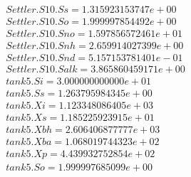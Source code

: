\begin{align*}
    Settler.S10.Ss = 1.315923153747e+00\\
    Settler.S10.So = 1.999997854492e+00\\
    Settler.S10.Sno = 1.597856572461e+01\\
    Settler.S10.Snh = 2.659914027399e+00\\
    Settler.S10.Snd = 5.157153781401e-01\\
    Settler.S10.Salk = 3.865860459171e+00\\
    tank5.Si = 3.000000000000e+01\\
    tank5.Ss = 1.263795984345e+00\\
    tank5.Xi = 1.123348086405e+03\\
    tank5.Xs = 1.185225923915e+01\\
    tank5.Xbh = 2.606406877777e+03\\
    tank5.Xba = 1.068019744323e+02\\
    tank5.Xp = 4.439932752854e+02\\
    tank5.So = 1.999997685099e+00\\
\end{align*}
